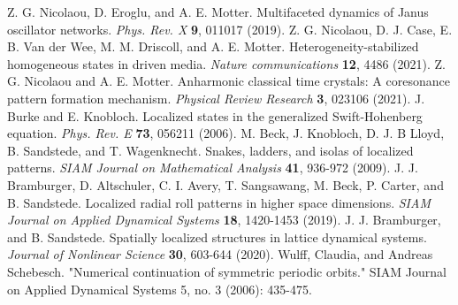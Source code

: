 \documentclass[aps,pre,amsmath,amssymb,floatfix,onecolumn,notitlepage,10pt]{revtex4-1}
\begin{document}
\begin{thebibliography}{99}
 Z. G. Nicolaou, D. Eroglu, and A. E. Motter. Multifaceted dynamics of Janus oscillator networks. \textit{Phys. Rev. X} \textbf{9}, 011017 (2019).
 Z. G. Nicolaou, D. J. Case, E. B. Van der Wee, M. M. Driscoll, and A. E. Motter. Heterogeneity-stabilized homogeneous states in driven media. \textit{Nature communications} \textbf{12}, 4486 (2021).
 Z. G. Nicolaou and A. E. Motter. Anharmonic classical time crystals: A coresonance pattern formation mechanism. \textit{Physical Review Research} \textbf{3}, 023106 (2021).
 J. Burke and E. Knobloch. Localized states in the generalized Swift-Hohenberg equation. \textit{Phys. Rev. E} \textbf{73}, 056211 (2006).
 M. Beck, J. Knobloch, D. J. B Lloyd, B. Sandstede, and T. Wagenknecht. Snakes, ladders, and isolas of localized patterns. \textit{SIAM Journal on Mathematical Analysis} \textbf{41}, 936-972 (2009).
J. J. Bramburger, D. Altschuler, C. I. Avery, T. Sangsawang, M. Beck, P. Carter, and B. Sandstede. Localized radial roll patterns in higher space dimensions. \textit{SIAM Journal on Applied Dynamical Systems} \textbf{18}, 1420-1453 (2019).
J. J. Bramburger, and B. Sandstede. Spatially localized structures in lattice dynamical systems. \textit{Journal of Nonlinear Science} \textbf{30}, 603-644 (2020).
 Wulff, Claudia, and Andreas Schebesch. "Numerical continuation of symmetric periodic orbits." SIAM Journal on Applied Dynamical Systems 5, no. 3 (2006): 435-475.
\end{thebibliography}
\end{document}
